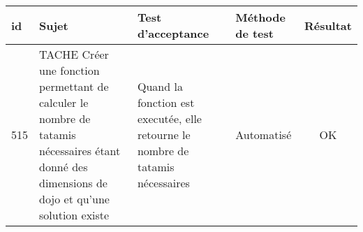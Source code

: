 \noindent%
\begin{adjustwidth}{-1.5cm}{0cm}

    \renewcommand{\arraystretch}{1.2}
    {\setlength{\tabcolsep}{1.5 mm}
        \begin{tabular}{|m{0.6cm}|m{5.5cm}|m{8cm}|m{2cm}|c|} \hline
            id                       & Sujet                                                                                                                                         & Test d'acceptance                                                                                                                                                                                                          & Méthode de test & Résultat \\ \hline
            515                      & TACHE Créer une fonction permettant de calculer le nombre de tatamis nécessaires étant donné des dimensions de dojo et qu'une solution existe & Quand la fonction est executée, elle retourne le nombre de tatamis nécessaires                                                                                                                                             & Automatisé      & OK       \\ \hline


\end{tabular}}
\end{adjustwidth}
